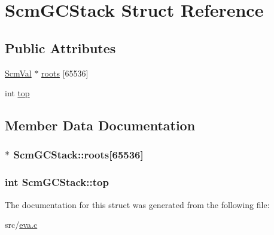 \hypertarget{struct_scm_g_c_stack}{\section{Scm\-G\-C\-Stack Struct Reference}
\label{struct_scm_g_c_stack}
}
\subsection*{Public Attributes}
\begin{DoxyCompactItemize}
\item 
\hyperlink{eva_8h_a9e754b130d398cb7a4000c8c7a046427}{Scm\-Val} $\ast$ \hyperlink{struct_scm_g_c_stack_ad6337866b33b771df48905468dc8b504}{roots} \mbox{[}65536\mbox{]}
\item 
int \hyperlink{struct_scm_g_c_stack_a5bc9190933c6c0494962c3aee9196ec1}{top}
\end{DoxyCompactItemize}


\subsection{Member Data Documentation}
\hypertarget{struct_scm_g_c_stack_ad6337866b33b771df48905468dc8b504}{
\subsubsection[{roots}]{$\ast$ Scm\-G\-C\-Stack\-::roots\mbox{[}65536\mbox{]}}}\label{struct_scm_g_c_stack_ad6337866b33b771df48905468dc8b504}
\hypertarget{struct_scm_g_c_stack_a5bc9190933c6c0494962c3aee9196ec1}{
\subsubsection[{top}]{\setlength{\rightskip}{0pt plus 5cm}int Scm\-G\-C\-Stack\-::top}}\label{struct_scm_g_c_stack_a5bc9190933c6c0494962c3aee9196ec1}


The documentation for this struct was generated from the following file\-:\begin{DoxyCompactItemize}
\item 
src/\hyperlink{eva_8c}{eva.\-c}\end{DoxyCompactItemize}
